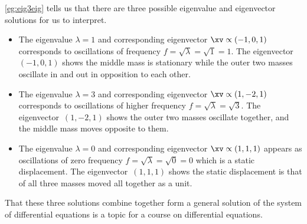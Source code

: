 \begin{example}
\autoref{eg:eig3eig} tells us that there are three possible eigenvalue and eigenvector solutions for us to interpret.
\begin{itemize}
\item The eigenvalue \(\lambda=1\) and corresponding eigenvector \(\xv\propto(-1,0,1)\) corresponds to oscillations of frequency \(f=\sqrt\lambda=\sqrt 1=1\).
The eigenvector~\((-1,0,1)\) shows the middle mass is stationary while the outer two masses oscillate in and out in opposition to each other.
\item The eigenvalue \(\lambda=3\) and corresponding eigenvector \(\xv\propto(1,-2,1)\) corresponds to oscillations of higher frequency \(f=\sqrt\lambda=\sqrt 3\).
The eigenvector~\((1,-2,1)\) shows the outer two masses oscillate together, and the middle mass moves opposite to them.
\item The eigenvalue \(\lambda=0\) and corresponding eigenvector \(\xv\propto(1,1,1)\) appears as oscillations of zero frequency \(f=\sqrt\lambda=\sqrt 0=0\) which is a static displacement.
The eigenvector~\((1,1,1)\) shows the static displacement is that of all three masses moved all together as a unit.
\end{itemize}
That these three solutions combine together form a general solution of the system of differential equations is a topic for a course on differential equations.
\end{example}




